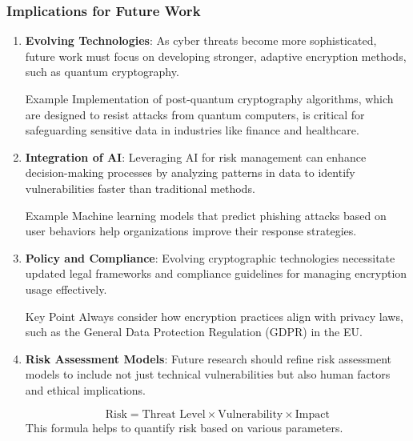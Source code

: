 \documentclass{beamer}
\begin{document}
\begin{frame}[fragile]
    \frametitle{Implications for Future Work}
    
    \begin{enumerate}
        \item \textbf{Evolving Technologies}: 
        As cyber threats become more sophisticated, future work must focus on developing stronger, adaptive encryption methods, such as quantum cryptography.
        
        \begin{block}{Example}
            Implementation of post-quantum cryptography algorithms, which are designed to resist attacks from quantum computers, is critical for safeguarding sensitive data in industries like finance and healthcare.
        \end{block}
        
        \item \textbf{Integration of AI}: 
        Leveraging AI for risk management can enhance decision-making processes by analyzing patterns in data to identify vulnerabilities faster than traditional methods.
        
        \begin{block}{Example}
            Machine learning models that predict phishing attacks based on user behaviors help organizations improve their response strategies.
        \end{block}
        
        \item \textbf{Policy and Compliance}: 
        Evolving cryptographic technologies necessitate updated legal frameworks and compliance guidelines for managing encryption usage effectively.
        
        \begin{block}{Key Point}
            Always consider how encryption practices align with privacy laws, such as the General Data Protection Regulation (GDPR) in the EU.
        \end{block}
        
        \item \textbf{Risk Assessment Models}: 
        Future research should refine risk assessment models to include not just technical vulnerabilities but also human factors and ethical implications.
        
        \begin{equation}
            \text{Risk} = \text{Threat Level} \times \text{Vulnerability} \times \text{Impact}
        \end{equation}
        This formula helps to quantify risk based on various parameters.
    \end{enumerate}
\end{frame}
\end{document}
